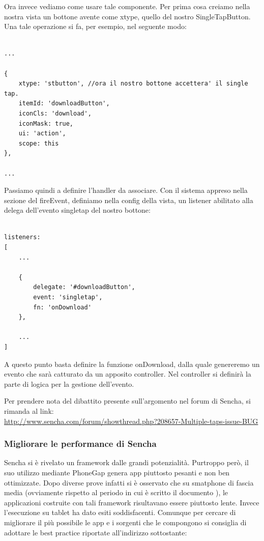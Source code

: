 \documentclass[10pt,a4paper,onecolumn]{article}
\begin{document}
Ora invece vediamo come usare tale componente. Per prima cosa creiamo nella nostra vista un bottone avente come xtype, quello del nostro SingleTapButton. Una tale operazione si fa, per esempio, nel seguente modo:

\begin{lstlisting}

...

{
	xtype: 'stbutton', //ora il nostro bottone accettera' il single tap.
	itemId: 'downloadButton',
	iconCls: 'download',
	iconMask: true,
	ui: 'action',
	scope: this
},

...

\end{lstlisting}

Passiamo quindi a definire l'handler da associare. Con il sistema appreso nella sezione del fireEvent, definiamo nella config della vista, un listener abilitato alla delega dell'evento singletap del nostro bottone:

\begin{lstlisting}

listeners:
[
	...
			
	{
		delegate: '#downloadButton',
		event: 'singletap',
		fn: 'onDownload'
	},
	
	...
]
\end{lstlisting}

A questo punto basta definire la funzione onDownload, dalla quale genereremo un evento che sarà catturato da un apposito controller. Nel controller si definirà la parte di logica per la gestione dell'evento.

Per prendere nota del dibattito presente sull'argomento nel forum di Sencha, si rimanda al link:\\

\url{http://www.sencha.com/forum/showthread.php?208657-Multiple-taps-issue-BUG}

\subsubsection{Migliorare le performance di Sencha}

Sencha si è rivelato un framework dalle grandi potenzialità. Purtroppo però, il suo utilizzo mediante PhoneGap genera app piuttosto pesanti e non ben ottimizzate. Dopo diverse prove infatti si è osservato che su smatphone di fascia media (ovviamente rispetto al periodo in cui è scritto il documento ), le applicazioni costruite con tali framework risultavano essere piuttosto lente. Invece l'esecuzione su tablet ha dato esiti soddisfacenti. Comunque per cercare di migliorare il più possibile le app e i sorgenti che le compongono si consiglia di adottare le best practice riportate all'indirizzo sottostante:\\
\end{document}
